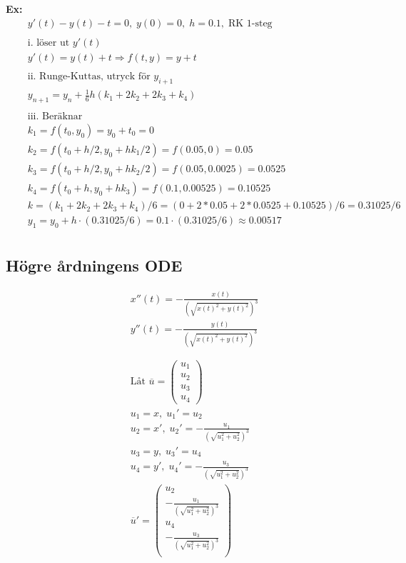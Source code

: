 \textbf{Ex:}
\begin{align*}
    &\quad  y'(t)-y(t)-t=0, \; y(0)=0, \; h=0.1, \; \text{RK 1-steg} \\
    &\quad  \\
    &\quad  \text{i. löser ut } y'(t) \\
    &\quad  y'(t)=y(t)+t \Rightarrow f(t,y) = y+t \\
    &\quad  \\
    &\quad  \text{ii. Runge-Kuttas, utryck för } y_{i+1} \\
    &\quad  y_{n+1} = y_n+\frac{1}{6}h(k_1+2k_2+2k_3+k_4) \\
    &\quad  \\
    &\quad  \text{iii. Beräknar } \\
    &\quad  k_1 = f(t_0,y_0) = y_0 + t_0 = 0 \\
    &\quad  k_2 = f(t_0+h/2,y_0+hk_1/2) = f(0.05,0) = 0.05 \\
    &\quad  k_3 = f(t_0+h/2,y_0+hk_2/2) = f(0.05,0.0025) = 0.0525 \\
    &\quad  k_4 = f(t_0+h,y_0+hk_3) = f(0.1,0.00525) = 0.10525 \\
    &\quad  k = (k_1+2k_2+2k_3+k_4)/6 = (0+2*0.05+2*0.0525+0.10525)/6=0.31025/6 \\
    &\quad  y_1 = y_0 + h\cdot(0.31025/6) = 0.1\cdot(0.31025/6) \approx 0.00517 \\
\end{align*}

\newpage
\subsection{Högre årdningens ODE}
\begin{align*}
  &\quad  x''(t) = -\frac{x(t)}{(\sqrt{x(t)^2+y(t)^2})^3} \\
  &\quad  y''(t) = -\frac{y(t)}{(\sqrt{x(t)^2+y(t)^2})^3} \\
  &\quad  \\
  &\quad  \\
  &\quad  \text{Låt } \overline{u} =  \begin{pmatrix} u_1 \\ u_2 \\ u_3 \\ u_4 \end{pmatrix} \\
  &\quad  u_1 = x,  \; u_1' = u_2 \\
  &\quad  u_2 = x', \; u_2' = -\frac{u_1}{(\sqrt{u_1^2+u_2^2})^3} \\
  &\quad  u_3 = y,  \; u_3' = u_4 \\
  &\quad  u_4 = y', \; u_4' = -\frac{u_3}{(\sqrt{u_1^2+u_2^2})^3} \\
  &\quad  \overline{u}' =
  \begin{pmatrix}
      u_2 \\
      -\frac{u_1}{(\sqrt{u_1^2+u_2^2})^3} \\
      u_4 \\
      -\frac{u_3}{(\sqrt{u_1^2+u_2^2})^3} \\
  \end{pmatrix} \\
\end{align*}

